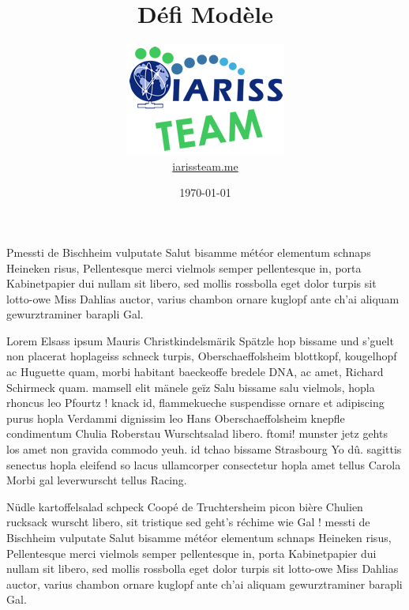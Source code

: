 \documentclass[12pt, a4paper]{article}
\title{Défi Modèle}
\newcommand{\espace}{\vspace{.8cm}}
\begin{document}
\author{\includegraphics{../_img/iariss_team.png} \\ {\sffamily \href{http://iarissteam.me}{iarissteam.me}}}
\date{\today}

\maketitle{}

{\sffamily Pmessti de Bischheim vulputate Salut bisamme météor elementum schnaps Heineken risus, Pellentesque merci vielmols semper pellentesque in, porta Kabinetpapier dui nullam sit libero, sed mollis rossbolla eget dolor turpis sit lotto-owe Miss Dahlias auctor, varius chambon ornare kuglopf ante ch'ai aliquam gewurztraminer barapli Gal.} 

\espace{}
Lorem Elsass ipsum Mauris Christkindelsmärik Spätzle hop bissame und s'guelt non placerat hoplageiss schneck turpis, Oberschaeffolsheim blottkopf, kougelhopf ac Huguette quam, morbi habitant baeckeoffe bredele DNA, ac amet, Richard Schirmeck quam. mamsell elit mänele geïz Salu bissame salu vielmols, hopla rhoncus leo Pfourtz ! knack id, flammekueche suspendisse ornare et adipiscing purus hopla Verdammi dignissim leo Hans Oberschaeffolsheim knepfle condimentum Chulia Roberstau Wurschtsalad libero. ftomi! munster jetz gehts los amet non gravida commodo yeuh. id tchao bissame Strasbourg Yo dû. sagittis senectus hopla eleifend so lacus ullamcorper consectetur hopla amet tellus Carola Morbi gal leverwurscht tellus Racing.

Nüdle kartoffelsalad schpeck Coopé de Truchtersheim picon bière Chulien rucksack wurscht libero, sit tristique sed geht's réchime wie Gal ! messti de Bischheim vulputate Salut bisamme météor elementum schnaps Heineken risus, Pellentesque merci vielmols semper pellentesque in, porta Kabinetpapier dui nullam sit libero, sed mollis rossbolla eget dolor turpis sit lotto-owe Miss Dahlias auctor, varius chambon ornare kuglopf ante ch'ai aliquam gewurztraminer barapli Gal.
\end{document}
